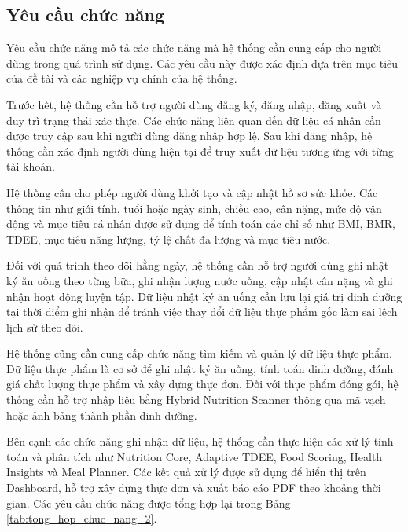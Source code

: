 \documentclass[12pt, a4paper]{report}
\begin{document}
\subsection{Yêu cầu chức năng}Yêu cầu chức năng mô tả các chức năng mà hệ thống cần cung cấp cho người dùng trong quá trình sử dụng. Các yêu cầu này được xác định dựa trên mục tiêu của đề tài và các nghiệp vụ chính của hệ thống.

Trước hết, hệ thống cần hỗ trợ người dùng đăng ký, đăng nhập, đăng xuất và duy trì trạng thái xác thực. Các chức năng liên quan đến dữ liệu cá nhân cần được truy cập sau khi người dùng đăng nhập hợp lệ. Sau khi đăng nhập, hệ thống cần xác định người dùng hiện tại để truy xuất dữ liệu tương ứng với từng tài khoản.

Hệ thống cần cho phép người dùng khởi tạo và cập nhật hồ sơ sức khỏe. Các thông tin như giới tính, tuổi hoặc ngày sinh, chiều cao, cân nặng, mức độ vận động và mục tiêu cá nhân được sử dụng để tính toán các chỉ số như BMI, BMR, TDEE, mục tiêu năng lượng, tỷ lệ chất đa lượng và mục tiêu nước.

Đối với quá trình theo dõi hằng ngày, hệ thống cần hỗ trợ người dùng ghi nhật ký ăn uống theo từng bữa, ghi nhận lượng nước uống, cập nhật cân nặng và ghi nhận hoạt động luyện tập. Dữ liệu nhật ký ăn uống cần lưu lại giá trị dinh dưỡng tại thời điểm ghi nhận để tránh việc thay đổi dữ liệu thực phẩm gốc làm sai lệch lịch sử theo dõi.

Hệ thống cũng cần cung cấp chức năng tìm kiếm và quản lý dữ liệu thực phẩm. Dữ liệu thực phẩm là cơ sở để ghi nhật ký ăn uống, tính toán dinh dưỡng, đánh giá chất lượng thực phẩm và xây dựng thực đơn. Đối với thực phẩm đóng gói, hệ thống cần hỗ trợ nhập liệu bằng Hybrid Nutrition Scanner thông qua mã vạch hoặc ảnh bảng thành phần dinh dưỡng.

Bên cạnh các chức năng ghi nhận dữ liệu, hệ thống cần thực hiện các xử lý tính toán và phân tích như Nutrition Core, Adaptive TDEE, Food Scoring, Health Insights và Meal Planner. Các kết quả xử lý được sử dụng để hiển thị trên Dashboard, hỗ trợ xây dựng thực đơn và xuất báo cáo PDF theo khoảng thời gian. Các yêu cầu chức năng được tổng hợp lại trong Bảng \ref{tab:tong_hop_chuc_nang_2}.
\end{document}
